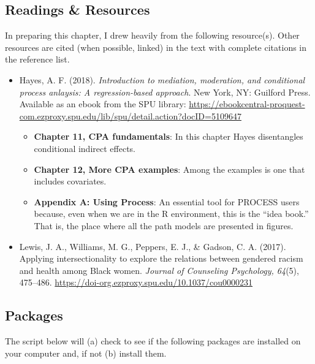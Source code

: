 \documentclass[
  english,
]{book}
\providecommand{\tightlist}{%
  \setlength{\itemsep}{0pt}\setlength{\parskip}{0pt}}
\begin{document}
\hypertarget{readings-resources-6}{%
\subsection{Readings \& Resources}\label{readings-resources-6}}

In preparing this chapter, I drew heavily from the following resource(s). Other resources are cited (when possible, linked) in the text with complete citations in the reference list.

\begin{itemize}
\tightlist
\item
  Hayes, A. F. (2018). \emph{Introduction to mediation, moderation, and conditional process anlaysis: A regression-based approach}. New York, NY: Guilford Press. Available as an ebook from the SPU library: \url{https://ebookcentral-proquest-com.ezproxy.spu.edu/lib/spu/detail.action?docID=5109647}

  \begin{itemize}
  \tightlist
  \item
    \textbf{Chapter 11, CPA fundamentals}: In this chapter Hayes disentangles conditional indirect effects.
  \item
    \textbf{Chapter 12, More CPA examples}: Among the examples is one that includes covariates.\\
  \item
    \textbf{Appendix A: Using Process}: An essential tool for PROCESS users because, even when we are in the R environment, this is the ``idea book.'' That is, the place where all the path models are presented in figures.
  \end{itemize}
\item
  Lewis, J. A., Williams, M. G., Peppers, E. J., \& Gadson, C. A. (2017). Applying intersectionality to explore the relations between gendered racism and health among Black women. \emph{Journal of Counseling Psychology, 64}(5), 475--486. \url{https://doi-org.ezproxy.spu.edu/10.1037/cou0000231}
\end{itemize}

\hypertarget{packages-7}{%
\subsection{Packages}\label{packages-7}}

The script below will (a) check to see if the following packages are installed on your computer and, if not (b) install them.
\end{document}
